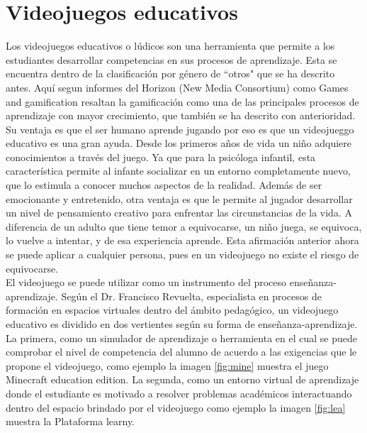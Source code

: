 \section{Videojuegos educativos}

Los videojuegos educativos o lúdicos son una herramienta que permite a los estudiantes desarrollar competencias en sus procesos de aprendizaje. Esta se encuentra dentro de la clasificación por género de ``otros" que se ha descrito antes. Aquí segun informes del Horizon (New Media Consortium) como Games and gamification \cite{vid07} resaltan la gamificación como una de las principales procesos de aprendizaje con mayor crecimiento, que también se ha descrito con anterioridad. 
\\[1pt]

Su ventaja es que el ser humano aprende jugando por eso es que un videojueggo educativo es una gran ayuda. Desde los primeros años de vida un niño adquiere conocimientos a través del juego. Ya que para la psicóloga infantil, esta característica permite al infante socializar en un entorno completamente nuevo, que lo estimula a conocer muchos aspectos de la realidad. Además de ser emocionante y entretenido, otra ventaja es que le permite al jugador desarrollar un nivel de pensamiento creativo para enfrentar las circunstancias de la vida. A diferencia de un adulto que tiene temor a equivocarse, un niño juega, se equivoca, lo vuelve a intentar, y de esa experiencia aprende. Esta afirmación anterior ahora se puede aplicar a cualquier persona, pues en un videojuego no existe el riesgo de equivocarse.
\\[1pt]

El videojuego se puede utilizar como un instrumento del proceso enseñanza-aprendizaje. Según el Dr. Francisco Revuelta, especialista en procesos de formación en espacios virtuales dentro del ámbito pedagógico, un videojuego educativo es dividido en dos vertientes según su forma de enseñanza-aprendizaje. La primera, como un simulador de aprendizaje o herramienta en el cual se puede comprobar el nivel de competencia del alumno de acuerdo a las exigencias que le propone el videojuego, como ejemplo la imagen \ref{fig:mine} muestra el juego Minecraft education edition. La segunda, como un entorno virtual de aprendizaje donde el estudiante es motivado a resolver problemas académicos interactuando dentro del espacio brindado por el videojuego\cite{vid06} como ejemplo la imagen \ref{fig:lea} muestra la Plataforma learny.
\\[1pt]

